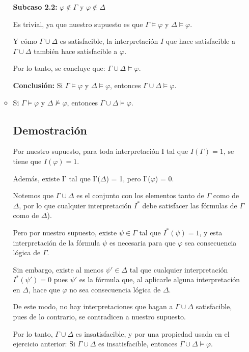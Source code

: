 \documentclass[11pt,letterpaper]{article}
\begin{document}
\begin{enumerate}
\begin{itemize}
      \textbf{Subcaso 2.2:} $\varphi \notin \Gamma$ y $\varphi \notin \Delta$

      Es trivial, ya que nuestro supuesto es que $\Gamma \vDash \varphi$ y $\Delta \vDash \varphi$.
      
      Y cómo $\Gamma \cup \Delta$ es satisfacible, la interpretación $I$ que hace satisfacible a $\Gamma \cup \Delta$ también hace satisfacible a $\varphi$.  

      Por lo tanto, se concluye que: $\Gamma \cup \Delta \vDash \varphi$.

      \bigskip

      \textbf{Conclusión:} Si $\Gamma \vDash \varphi$ y $\Delta \vDash \varphi$, entonces $\Gamma \cup \Delta \vDash \varphi$.

      \bigskip
      
    \item Si $\Gamma \vDash \varphi$ y $\Delta \nvDash \varphi$, entonces $\Gamma \cup \Delta \vDash \varphi$.
      \subsection*{Demostración}

      Por nuestro supuesto, para toda interpretación I tal que $I(\Gamma) = 1$, se tiene que $I(\varphi) = 1$.
      
      Además, existe I' tal que I'($\Delta$) = 1, pero I'($\varphi$) = 0.

      Notemos que $\Gamma \cup \Delta$ es el conjunto con los elementos tanto de $\Gamma$ como de $\Delta$, por lo que cualquier interpretación $I^{*}$ debe satisfacer las fórmulas de $\Gamma$ como de $\Delta$).

      Pero por nuestro supuesto, existe $\psi \in \Gamma$ tal que $I^{*}(\psi) = 1$, y esta interpretación de la fórmula $\psi$ es necesaria para que $\varphi$ sea consecuencia lógica de $\Gamma$.

      Sin embargo, existe al menos $\psi' \in \Delta$ tal que cualquier interpretación $I^{*}(\psi') = 0$ pues $\psi'$ es la fórmula que, al aplicarle alguna interpretación en $\Delta$, hace que $\varphi$ no sea consecuencia lógica de $\Delta$.

      De este modo, no hay interpretaciones que hagan a \( \Gamma \cup \Delta \) satisfacible, pues de lo contrario, se contradicen a nuestro supuesto.

      Por lo tanto, $\Gamma \cup \Delta$ es insatisfacible, y por una propiedad usada en el ejercicio anterior: Si $\Gamma \cup \Delta$ es insatisfacible, entonces $\Gamma \cup \Delta \vDash \varphi$.


\end{itemize}
\end{enumerate}
\end{document}
